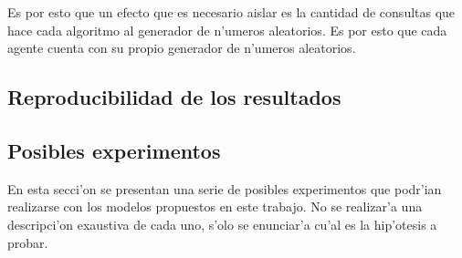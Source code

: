 Es por esto que un efecto que es necesario aislar es la cantidad de consultas que hace cada algoritmo al
generador de n'umeros aleatorios. Es por esto que cada agente cuenta con su propio generador de n'umeros aleatorios.

\subsection{Reproducibilidad de los resultados}

\subsection{Posibles experimentos}
En esta secci'on se presentan una serie de posibles experimentos que podr'ian realizarse con los modelos propuestos en este trabajo. 
No se realizar'a una descripci'on exaustiva de cada uno, s'olo se enunciar'a cu'al es la hip'otesis a probar.

